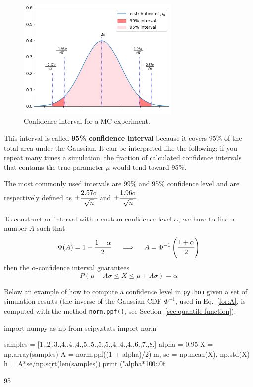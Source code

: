 \begin{figure}[htb]
\centering
\includegraphics[width=0.7\textwidth]{figures/confidence_interval}
\caption{Confidence interval for a MC experiment.}
\label{fig:confidence_interval}
\end{figure}

This interval is called \textbf{95\% confidence interval} because it covers 95\% of the total area under the Gaussian. It can be interpreted like the following: if you repeat many times a simulation, the fraction of calculated confidence intervals that contains the true parameter $\mu$ would tend toward 95\%.

The most commonly used intervals are 99\% and 95\% confidence level and are respectively defined as \(\pm \cfrac{2.57\sigma}{\sqrt{n}}\) and \(\pm \cfrac{1.96\sigma}{\sqrt{n}}\).

To construct an interval with a custom confidence level $\alpha$, we have to find a number $A$ such that
\begin{equation}
\Phi(A) = 1 - \frac{1-\alpha}{2}\quad\implies\quad A = \Phi^{-1}\left(\cfrac{1+\alpha}{2}\right)
\label{for:A}
\end{equation}
then the $\alpha$-confidence interval guarantees
\begin{equation}
P(\mu - A\sigma \le X \le \mu+ A\sigma) = \alpha 
\end{equation}

Below an example of how to compute a confidence level in \texttt{python} given a set of simulation results (the inverse of the Gaussian CDF $\Phi^{-1}$, used in Eq.~\ref{for:A}, is computed with the method \texttt{norm.ppf()}, see Section~\ref{sec:quantile-function}).

\begin{ipython}
import numpy as np
from scipy.stats import norm

samples = [1.,2.,3.,4.,4.,4.,5.,5.,5.,5.,4.,4.,4.,6.,7.,8.]
alpha = 0.95
X = np.array(samples)
A = norm.ppf((1 + alpha)/2)
m, se = np.mean(X), np.std(X)
h = A*se/np.sqrt(len(samples))
print ("{alpha*100:.0f}%
\end{ipython}
\begin{ioutput}
95%
\end{ioutput}

